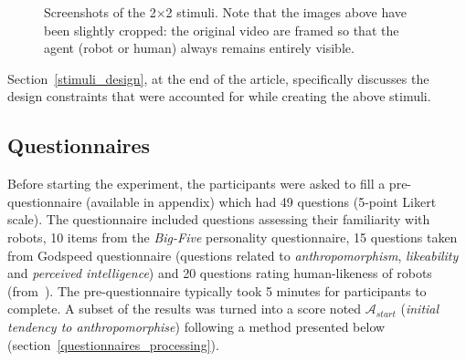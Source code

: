 \documentclass[lettersize, noapacite, twoside, HRI]{apa_HRI}
\newcommand{\anti}{{$\mathcal{A}_{start}$\xspace}}
\begin{document}
\begin{figure}


    \caption{\small Screenshots of the 2$\times$2 stimuli. Note that the images above have been
    slightly cropped: the original video are framed so that the agent (robot or
    human) always remains entirely visible.}
    \label{fig:stimuli}
\end{figure}

Section~\ref{stimuli_design}, at the end of the article, specifically discusses
the design constraints that were accounted for while creating the above stimuli.

\subsection{Questionnaires}

Before starting the experiment, the participants were asked to fill a
pre-questionnaire (available in appendix) which had 49 questions (5-point Likert scale). The
questionnaire included questions assessing their familiarity with robots, 10
items from the \emph{Big-Five} personality questionnaire, 15 questions taken from
Godspeed questionnaire (questions related to \emph{anthropomorphism},
\emph{likeability} and \emph{perceived intelligence}) and 20 questions rating
human-likeness of robots (from~\cite{ruijten_introducing_2014}). The pre-questionnaire
typically took 5 minutes for participants to complete. A subset of the results was turned into
a score noted \anti{} (\emph{initial tendency to anthropomorphise}) following a
method presented below (section~\ref{questionnaires_processing}).
\end{document}
